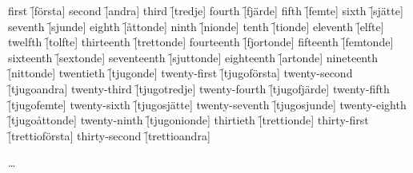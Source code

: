 \begin{questions}
    \begin{multicols}{2}
        \raggedcolumns
        \question first \f[första]
        \question second \f[andra]
        \question third \f[tredje]
        \question fourth \f[fjärde]
        \question fifth \f[femte]
        \question sixth \f[sjätte]
        \question seventh \f[sjunde]
        \question eighth \f[åttonde]
        \question ninth \f[nionde]
        \question tenth \f[tionde]
        \question eleventh \f[elfte]
        \question twelfth \f[tolfte]
        \question thirteenth \f[trettonde]
        \question fourteenth \f[fjortonde]
        \question fifteenth \f[femtonde]
        \question sixteenth \f[sextonde]
        \question seventeenth \f[sjuttonde]
        \question eighteenth \f[artonde]
        \question nineteenth \f[nittonde]
        \question twentieth \f[tjugonde]
        \question twenty-first \f[tjugoförsta]
        \question twenty-second \f[tjugoandra]
        \question twenty-third \f[tjugotredje]
        \question twenty-fourth \f[tjugofjärde]
        \question twenty-fifth \f[tjugofemte]
        \question twenty-sixth \f[tjugosjätte]
        \question twenty-seventh \f[tjugosjunde]
        \question twenty-eighth \f[tjugoåttonde]
        \question twenty-ninth \f[tjugonionde]
        \question thirtieth \f[trettionde]
        \question thirty-first \f[trettioförsta]
        \question thirty-second \f[trettioandra]

        \ldots


\end{multicols}
\end{questions}
